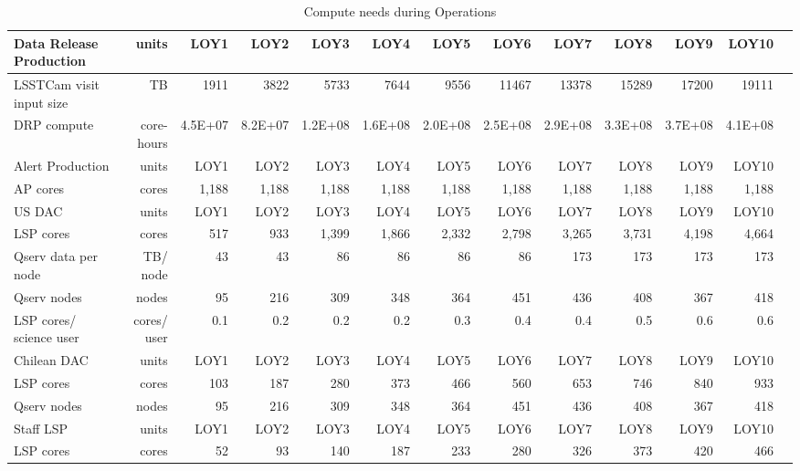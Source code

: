 \tiny \begin{longtable} { |p{}  |r  |r  |r  |r  |r  |r  |r  |r  |r  |r  |r  |r |} 
\caption{Compute needs during Operations \label{tab:computeSizingOps}}\\ 
\hline 
\textbf{Data Release Production}&\textbf{units}&\textbf{LOY1}&\textbf{LOY2}&\textbf{LOY3}&\textbf{LOY4}&\textbf{LOY5}&\textbf{LOY6}&\textbf{LOY7}&\textbf{LOY8}&\textbf{LOY9}&\textbf{LOY10} \\ \hline
{LSSTCam visit input size}&{TB}&{1911}&{3822}&{5733}&{7644}&{9556}&{11467}&{13378}&{15289}&{17200}&{19111} \\ \hline
{DRP compute}&{core-hours}&{4.5E+07}&{8.2E+07}&{1.2E+08}&{1.6E+08}&{2.0E+08}&{2.5E+08}&{2.9E+08}&{3.3E+08}&{3.7E+08}&{4.1E+08} \\ \hline
{Alert Production}&{units}&{LOY1}&{LOY2}&{LOY3}&{LOY4}&{LOY5}&{LOY6}&{LOY7}&{LOY8}&{LOY9}&{LOY10} \\ \hline
{AP cores}&{cores}&{1,188}&{1,188}&{1,188}&{1,188}&{1,188}&{1,188}&{1,188}&{1,188}&{1,188}&{1,188} \\ \hline
{US DAC}&{units}&{LOY1}&{LOY2}&{LOY3}&{LOY4}&{LOY5}&{LOY6}&{LOY7}&{LOY8}&{LOY9}&{LOY10} \\ \hline
{LSP cores}&{cores}&{517}&{933}&{1,399}&{1,866}&{2,332}&{2,798}&{3,265}&{3,731}&{4,198}&{4,664} \\ \hline
{Qserv data per node}&{TB/ node}&{43}&{43}&{86}&{86}&{86}&{86}&{173}&{173}&{173}&{173} \\ \hline
{Qserv nodes}&{nodes}&{95}&{216}&{309}&{348}&{364}&{451}&{436}&{408}&{367}&{418} \\ \hline
{LSP cores/ science user}&{cores/ user}&{0.1}&{0.2}&{0.2}&{0.2}&{0.3}&{0.4}&{0.4}&{0.5}&{0.6}&{0.6} \\ \hline
{Chilean DAC}&{units}&{LOY1}&{LOY2}&{LOY3}&{LOY4}&{LOY5}&{LOY6}&{LOY7}&{LOY8}&{LOY9}&{LOY10} \\ \hline
{LSP cores}&{cores}&{103}&{187}&{280}&{373}&{466}&{560}&{653}&{746}&{840}&{933} \\ \hline
{Qserv nodes}&{nodes}&{95}&{216}&{309}&{348}&{364}&{451}&{436}&{408}&{367}&{418} \\ \hline
{Staff LSP}&{units}&{LOY1}&{LOY2}&{LOY3}&{LOY4}&{LOY5}&{LOY6}&{LOY7}&{LOY8}&{LOY9}&{LOY10} \\ \hline
{LSP cores}&{cores}&{52}&{93}&{140}&{187}&{233}&{280}&{326}&{373}&{420}&{466} \\ \hline
\end{longtable} \normalsize
